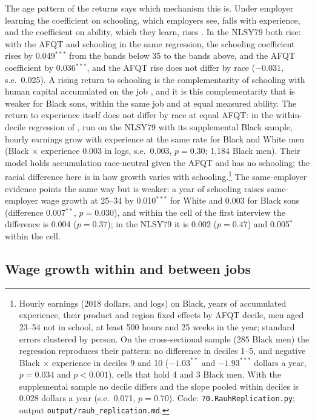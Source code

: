 The age pattern of the returns says which mechanism this is. Under employer learning the coefficient on schooling, which
employers see, falls with experience, and the coefficient on ability, which they learn, rises
\citep{altonji2001employer, lange2007speed, arcidiacono2010beyond}. In the NLSY79 both rise: with the AFQT and schooling
in the same regression, the schooling coefficient rises by 0.049$^{***}$ from the bands below 35 to the bands above, and
the AFQT coefficient by 0.036$^{***}$, and the AFQT rise does not differ by race ($-0.031$, s.e.\ 0.025). A rising return
to schooling is the complementarity of schooling with human capital accumulated on the job \citep{bhuller2017life},
and it is this complementarity that is weaker for Black sons, within the same job and at equal measured ability.
The return to experience itself does not differ by race at equal AFQT: in the within-decile regression of
\citet{rauh2023black}, run on the NLSY79 with its supplemental Black sample, hourly earnings grow with experience at the
same rate for Black and White men (Black $\times$ experience 0.003 in logs, s.e.\ 0.003, $p = 0.30$; 1,184 Black men).
Their model holds accumulation race-neutral given the AFQT and has no schooling; the racial difference here is in how
growth varies with schooling.\footnote{Hourly earnings (2018 dollars, and logs) on Black, years of accumulated
experience, their product and region fixed effects by AFQT decile, men aged 23--54 not in school, at least 500 hours and
25 weeks in the year; standard errors clustered by person. On the cross-sectional sample (285 Black men) the regression
reproduces their pattern: no difference in deciles 1--5, and negative Black $\times$ experience in deciles 9 and 10
($-1.03^{**}$ and $-1.93^{***}$ dollars a year, $p = 0.034$ and $p < 0.001$), cells that hold 4 and 3 Black men. With
the supplemental sample no decile differs and the slope pooled within deciles is 0.028 dollars a year (s.e.\ 0.071,
$p = 0.70$). Code: \texttt{70.RauhReplication.py}; output \texttt{output/rauh\_replication.md}.}
The same-employer evidence points the same way but is weaker: a year of schooling raises same-employer wage growth at
25--34 by 0.010$^{***}$ for White and 0.003 for Black sons (difference 0.007$^{**}$, $p=0.030$), and within the cell of
the first interview the difference is 0.004 ($p=0.37$); in the NLSY79 it is 0.002 ($p=0.47$) and 0.005$^{*}$ within the
cell.



\subsection{Wage growth within and between jobs}

